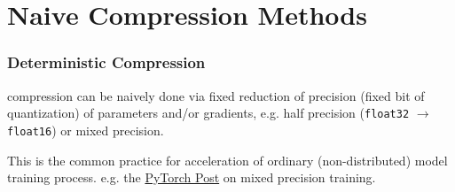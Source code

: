 
\section{Naive Compression Methods}


\begin{frame}
\frametitle{Deterministic Compression}

compression can be naively done via fixed reduction of precision (fixed bit of quantization) of parameters and/or gradients, e.g. {\color{red} half precision} (\texttt{float32} $\to$ \texttt{float16}) or {\color{red} mixed precision}.

\vspace{0.6em}

This is the common practice for acceleration of ordinary (non-distributed) model training process. e.g. the \href{https://pytorch.org/blog/accelerating-training-on-nvidia-gpus-with-pytorch-automatic-mixed-precision/}{PyTorch Post} on mixed precision training.

\end{frame}


